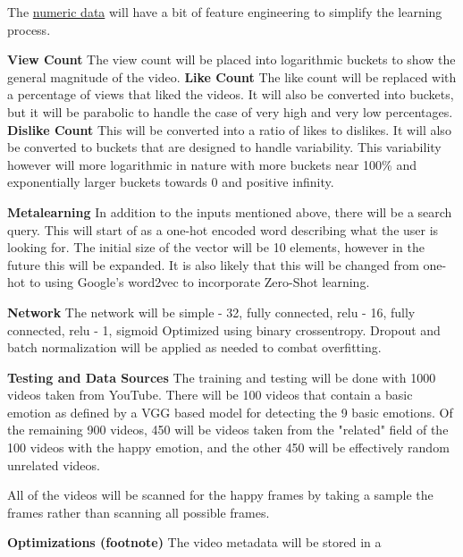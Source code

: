 \documentclass{article}
\newcommand{\br}{ \hfill \break}
\begin{document}
\begin{adjustwidth}{2.5em}{0pt}
\begin{adjustwidth}{2.5em}{0pt}
The \underline{numeric data} will have a bit of feature engineering to simplify the learning process. \br
\begin{adjustwidth}{2.5em}{0pt} \br
    \textbf{View Count} The view count will be placed into logarithmic buckets to show the general magnitude of the video. \br \br 
    \textbf{Like Count} The like count will be replaced with a percentage of views that liked the videos. It will also be converted into buckets, but it will be parabolic to handle the case of very high and very low percentages. \br  \br 
    \textbf{Dislike Count} This will be converted into a ratio of likes to dislikes. It will also be converted to buckets that are designed to handle variability. This variability however will more logarithmic in nature with more buckets near 100\% and exponentially larger buckets towards 0 and positive infinity.
\end{adjustwidth}\br\br





\textbf{Metalearning} \br
In addition to the inputs mentioned above, there will be a search query. This will start of as a one-hot encoded word describing what the user is looking for. The initial size of the vector will be 10 elements, however in the future this will be expanded. It is also likely that this will be changed from one-hot to using Google's word2vec to incorporate Zero-Shot learning. \br\br


\textbf{Network} \br
The network will be simple \br 
- 32, fully connected, relu \br 
- 16, fully connected, relu \br
- 1, sigmoid \br
Optimized using binary crossentropy. Dropout and batch normalization will be applied as needed to combat overfitting.\br\br


\textbf{Testing and Data Sources} \br
The training and testing will be done with 1000 videos taken from YouTube. There will be 100 videos that contain a basic emotion as defined by a VGG based model for detecting the 9 basic emotions. Of the remaining 900 videos, 450 will be videos taken from the "related" field of the 100 videos with the happy emotion, and the other 450 will be effectively random unrelated videos. \br

All of the videos will be scanned for the happy frames by taking a sample the frames rather than scanning all possible frames. \br \br

\textbf{Optimizations (footnote)} \br
The video metadata will be stored in a 





\end{adjustwidth}
\end{adjustwidth}
\end{document}
